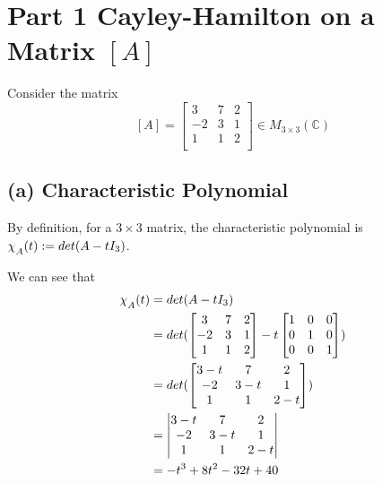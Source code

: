 \documentclass[12pt, letterpaper]{article}
\newcommand{\C}{\mathbb{C}}
\begin{document}
\section*{Part 1 \textmd{Cayley-Hamilton on a Matrix $[A]$}}

Consider the matrix
\renewcommand{\arraystretch}{0.8}
$$[A] = \begin{bmatrix}
3 & 7 & 2 \\
-2 & 3 & 1 \\
1 & 1 & 2 \\
\end{bmatrix} \in M_{3\times3}(\C)$$

\subsection*{(a) \textmd{Characteristic Polynomial}}

By definition, for a $3\times3$ matrix, the characteristic polynomial is $\chi_{\raisebox{-.5ex}{$\scriptstyle A$}}(t) := det(A-tI_3)$.

We can see that
\begin{align*}
		\chi_{\raisebox{-.5ex}{$\scriptstyle A$}}(t) &= det(A-tI_3) \\
			&= det(
			\begin{bmatrix}
			3 & 7 & 2 \\
			-2 & 3 & 1 \\
			1 & 1 & 2 \\
			\end{bmatrix} 
			- t
			\begin{bmatrix}
			1 & 0 & 0 \\
			0 & 1 & 0 \\
			0 & 0 & 1 \\
			\end{bmatrix} ) \\	
			&= det(
			\begin{bmatrix}
			3 - t & 7 & 2 \\
			-2 & 3 - t & 1 \\
			1 & 1 & 2 - t \\
			\end{bmatrix}
			) \\			
			&= \begin{vmatrix}
			3 - t & 7 & 2 \\
			-2 & 3 - t & 1 \\
			1 & 1 & 2 - t \\
			\end{vmatrix} \\
			&= -t^3+8t^2-32t+40
\end{align*}
\end{document}
